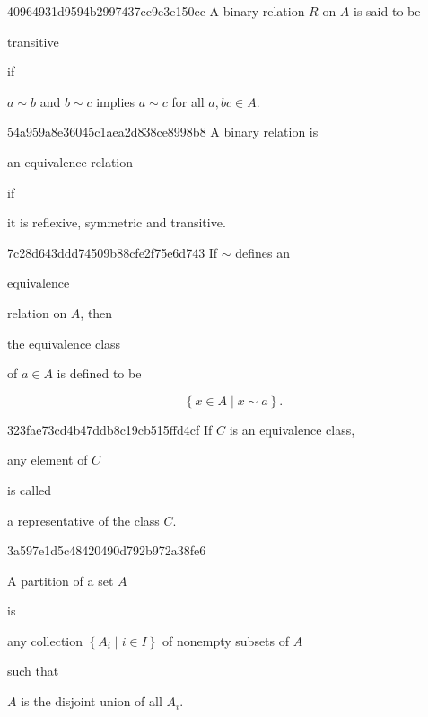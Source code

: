 \begin{note}{40964931d9594b2997437cc9e3e150cc}
    A binary relation \({ R }\) on \({ A }\) is said to be \begin{icloze}{2}transitive\end{icloze} if
    \begin{icloze}{1}
        \begin{center}
            \({ a \sim b }\) and \({ b \sim c }\) implies \({ a \sim c }\) for all \({ a, b c \in A }\).
        \end{center}
    \end{icloze}
\end{note}

\begin{note}{54a959a8e36045c1aea2d838ce8998b8}
    A binary relation is \begin{icloze}{2}an equivalence relation\end{icloze} if \begin{icloze}{1}it is reflexive, symmetric and transitive.\end{icloze}
\end{note}

\begin{note}{7c28d643ddd74509b88cfe2f75e6d743}
    If \({ \sim }\) defines an \begin{icloze}{3}equivalence\end{icloze} relation on \({ A }\), then \begin{icloze}{2}the equivalence class\end{icloze} of \({ a \in A }\) is defined to be
    \begin{icloze}{1}
        \[
            \left\{ x \in A \mid x \sim a \right\}.
        \]
    \end{icloze}
\end{note}

\begin{note}{323fae73cd4b47ddb8c19cb515ffd4cf}
    If \({ C }\) is an equivalence class, \begin{icloze}{2}any element of \({ C }\)\end{icloze} is called \begin{icloze}{1}a representative of the class \({ C }\).\end{icloze}
\end{note}

\begin{note}{3a597e1d5c48420490d792b972a38fe6}
    \begin{icloze}{2}A partition of a set \({ A }\)\end{icloze} is \begin{icloze}{3}any collection \({ \left\{ A_i \mid i \in I \right\} }\) of nonempty subsets of \({ A }\)\end{icloze} such that \begin{icloze}{1}\({ A }\) is the disjoint union of all \({ A_i }\).\end{icloze}
\end{note}

